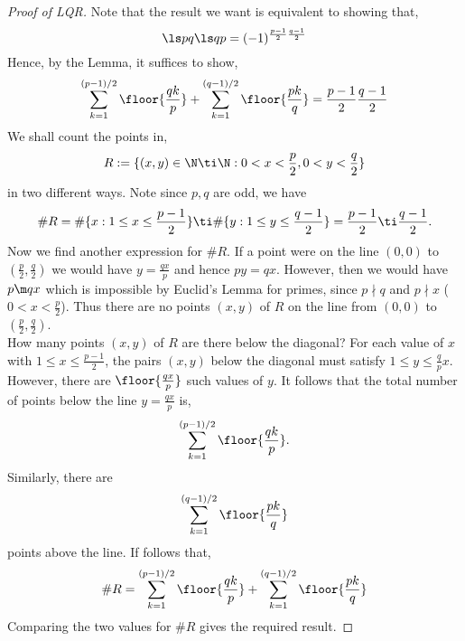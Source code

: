 \begin{proof}[Proof of LQR]
  Note that the result we want is equivalent to showing that,
  $$ \ls p q \ls q p = (-1)^{\frac{p-1}{2}\frac{q-1}{2}} $$
  Hence, by the Lemma, it suffices to show,
  $$ \sum_{k=1}^{(p-1)/2} \floor{\frac{qk}{p}} + \sum_{k=1}^{(q-1)/2} \floor{\frac{pk}{q}} = \frac{p-1}{2} \frac{q-1}{2}$$
  We shall count the points in,
  $$ R := \{(x, y) \in \N \ti \N : 0 < x < \frac{p}{2}, 0 < y < \frac{q}{2}\} $$
  in two different ways. Note since $p, q$ are odd, we have
  $$ \# R = \# \{x : 1 \le x \le \frac{p-1}{2}\} \ti \# \{y : 1 \le y \le \frac{q-1}{2}\} = \frac{p-1}{2}\ti \frac{q-1}{2}. $$
  Now we find another expression for $\# R$. If a point were on the line $(0, 0)$ to $(\frac{p}{2}, \frac{q}{2})$ we would have $y = \frac{qx}{p}$ and hence $py = qx$. However, then we would have $p \m qx$ which is impossible by Euclid's Lemma for primes, since $p \nmid q$ and $p \nmid x$ ($0 < x < \frac{p}{2}$). Thus there are no points $(x, y)$ of $R$ on the line from $(0, 0)$ to $(\frac{p}{2}, \frac{q}{2})$. \\

  \noindent
  How many points $(x, y)$ of $R$ are there below the diagonal? For each value of $x$ with $1 \le x \le \frac{p-1}{2}$, the pairs $(x, y)$ below the diagonal must satisfy $1 \le y \le \frac{q}{p}x$. However, there are $\floor{ \frac{qx}{p}}$ such values of $y$. It follows that the total number of points below the line $y = \frac{qx}{p}$ is,
  $$ \sum_{k=1}^{(p-1)/2} \floor{\frac{qk}{p}}. $$
  Similarly, there are
  $$ \sum_{k=1}^{(q-1)/2} \floor{\frac{pk}{q}} $$
  points above the line. If follows that,
  $$ \# R = \sum_{k=1}^{(p-1)/2} \floor{\frac{qk}{p}} + \sum_{k=1}^{(q-1)/2} \floor{\frac{pk}{q}} $$
  Comparing the two values for $\# R$ gives the required result.
\end{proof}

